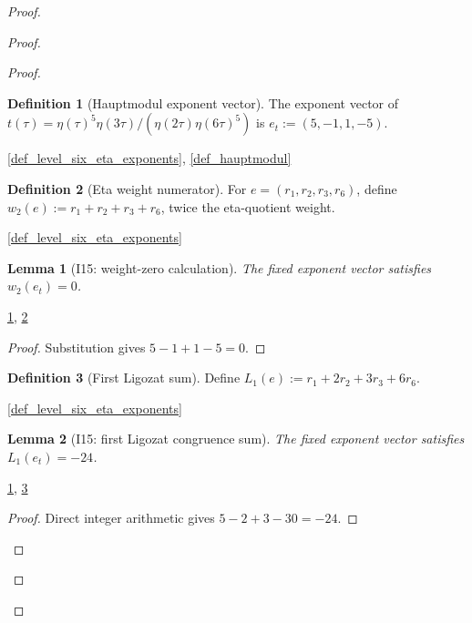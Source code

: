 \documentclass[11pt,a4paper]{article}
\numberwithin{equation}{section}
\theoremstyle{plain}\newtheorem{theorem}{Theorem}[section]\newaliascnt{proposition}{theorem}\newtheorem{proposition}[proposition]{Proposition}\aliascntresetthe{proposition}\newaliascnt{lemma}{theorem}\newtheorem{lemma}[lemma]{Lemma}\aliascntresetthe{lemma}
\theoremstyle{definition}\newaliascnt{definition}{theorem}\newtheorem{definition}[definition]{Definition}\aliascntresetthe{definition}\newaliascnt{notation}{theorem}\newtheorem{notation}[notation]{Notation}\aliascntresetthe{notation}
\providecommand{\lean}[1]{}\providecommand{\leanok}{}
\begin{document}
\begin{proof}
\begin{proof}
\begin{proof}
\begin{definition}[Hauptmodul exponent vector]\label{def_hauptmodul_exponents}\lean{SptCM.CM.Repaired.hauptmodulExponents}\leanok
The exponent vector of $t(\tau)=\eta(\tau)^5\eta(3\tau)/(\eta(2\tau)\eta(6\tau)^5)$ is
$e_t:=(5,-1,1,-5)$.
\end{definition}
\begin{uses-statement}\ref{def_level_six_eta_exponents}, \ref{def_hauptmodul}\end{uses-statement}

\begin{definition}[Eta weight numerator]\label{def_eta_weight_numerator}\lean{SptCM.CM.Repaired.etaWeightNumerator}\leanok
For $e=(r_1,r_2,r_3,r_6)$, define $w_2(e):=r_1+r_2+r_3+r_6$, twice the eta-quotient weight.
\end{definition}
\begin{uses-statement}\ref{def_level_six_eta_exponents}\end{uses-statement}

\begin{lemma}[I15: weight-zero calculation]\label{lem_i15_weight_zero}\lean{SptCM.CM.Repaired.hauptmodul_weight_numerator}\leanok
The fixed exponent vector satisfies $w_2(e_t)=0$.
\end{lemma}
\begin{uses-statement}\ref{def_hauptmodul_exponents}, \ref{def_eta_weight_numerator}\end{uses-statement}
\begin{proof}Substitution gives $5-1+1-5=0$.\end{proof}

\begin{definition}[First Ligozat sum]\label{def_first_ligozat_sum}\lean{SptCM.CM.Repaired.firstLigozatSum}\leanok
Define $L_1(e):=r_1+2r_2+3r_3+6r_6$.
\end{definition}
\begin{uses-statement}\ref{def_level_six_eta_exponents}\end{uses-statement}

\begin{lemma}[I15: first Ligozat congruence sum]\label{lem_i15_first_ligozat_sum}\lean{SptCM.CM.Repaired.hauptmodul_first_ligozat_sum}\leanok
The fixed exponent vector satisfies $L_1(e_t)=-24$.
\end{lemma}
\begin{uses-statement}\ref{def_hauptmodul_exponents}, \ref{def_first_ligozat_sum}\end{uses-statement}
\begin{proof}Direct integer arithmetic gives $5-2+3-30=-24$.\end{proof}


\end{proof}
\end{proof}
\end{proof}
\end{document}
